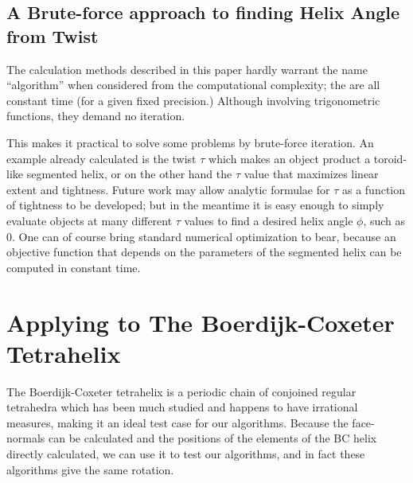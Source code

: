 \documentclass[11pt]{article}
\begin{document}
{\subsection{A Brute-force approach to finding Helix Angle from Twist}

The calculation methods described in this paper hardly warrant the name ``algorithm'' when considered from the computational complexity;
the are all constant time (for a given fixed precision.)
Although involving trigonometric functions, they demand no iteration.

This makes it practical to solve some problems by brute-force iteration.
An example already calculated is the twist $\tau$ which makes
an object product a toroid-like segmented helix, or on the other hand
the $\tau$ value that maximizes linear extent and tightness.
Future work may allow analytic formulae for $\tau$ as a function of
tightness to be developed; but in the meantime it is easy enough
to simply evaluate objects at many different $\tau$ values to find a
desired helix angle $\phi$, such as $0$. One can of course bring
standard numerical optimization to bear, because an objective function
that depends on the parameters of the segmented helix can
be computed in constant time.

\section{Applying to The Boerdijk-Coxeter Tetrahelix}

The Boerdijk-Coxeter tetrahelix is a periodic chain of conjoined regular tetrahedra
which has been much studied\cite{coxeter1985simplicial,sadler2013periodic,fuller1982synergetics,read2018transforming}
and happens to have irrational measures, making it an ideal
test case for our algorithms. Because the face-normals can be calculated and the
positions of the elements of the BC helix directly calculated, we can use
it to test our algorithms, and in fact these algorithms give the same rotation.

}
\end{document}
